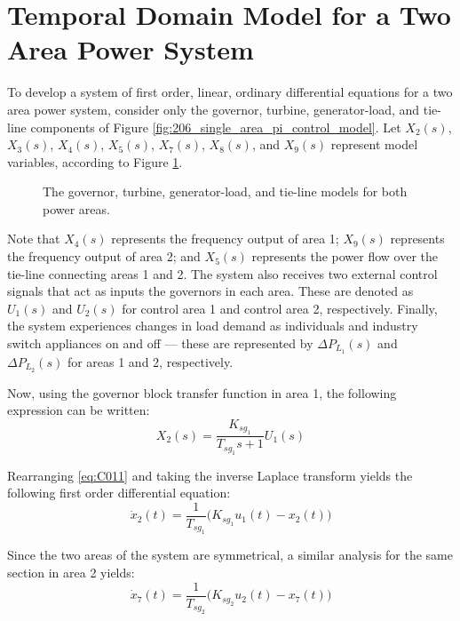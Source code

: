 \section{Temporal Domain Model for a Two Area Power System} \label{app:C1_power_system_ode}

To develop a system of first order, linear, ordinary differential equations for a two area power system, consider only the governor, turbine, generator-load, and tie-line components of Figure \ref{fig:206_single_area_pi_control_model}. Let $X_2(s)$, $X_3(s)$, $X_4(s)$, $X_5(s)$, $X_7(s)$, $X_8(s)$, and $X_9(s)$ represent model variables, according to Figure \ref{fig:C101}.

\begin{figure}[h]
	\centering
	\resizebox{\textwidth}{!}{}
	\caption[Combined governor, turbine, generator-load, and tie-line for a two power area system]{The governor, turbine, generator-load, and tie-line models for both power areas.}
	\label{fig:C101}
\end{figure}

Note that $X_4(s)$ represents the frequency output of area 1; $X_9(s)$ represents the frequency output of area 2; and $X_5(s)$ represents the power flow over the tie-line connecting areas 1 and 2. The system also receives two external control signals that act as inputs the governors in each area. These are denoted as $U_1(s)$ and $U_2(s)$ for control area 1 and control area 2, respectively. Finally, the system experiences changes in load demand as individuals and industry switch appliances on and off --- these are represented by $\Delta P_{L_1}(s)$ and $\Delta P_{L_2}(s)$ for areas 1 and 2, respectively.

Now, using the governor block transfer function in area 1, the following expression can be written:
\begin{equation}
	X_2(s) = \frac{K_{sg_1}}{T_{sg_1}s + 1} U_1(s) \label{eq:C011}
\end{equation}

Rearranging \ref{eq:C011} and taking the inverse Laplace transform yields the following first order differential equation:
\begin{equation}
	\dot{x}_2(t) = \frac{1}{T_{sg_1}}\big( K_{sg_1} u_1(t) - x_2(t) \big) \label{eq:C012}
\end{equation}

Since the two areas of the system are symmetrical, a similar analysis for the same section in area 2 yields:
\begin{equation}
	\dot{x}_7(t) = \frac{1}{T_{sg_2}}\big( K_{sg_2} u_2(t) - x_7(t) \big) \label{eq:C013}
\end{equation}

